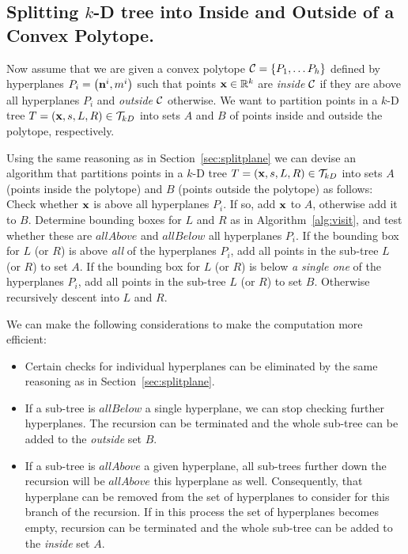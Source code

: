 \subsection{Splitting $k$-D tree into Inside and Outside of a Convex Polytope.}
Now assume that we are given a convex polytope $\mathcal{C} = \left\{P_1, \dots P_h\right\}$ defined by hyperplanes $P_i=\left(\mathbf{n}^i, m^i\right)$
  such that points $\mathbf{x}\in\mathbb{R}^k$ are \emph{inside} $\mathcal{C}$ if they are above all hyperplanes $P_i$ and \emph{outside} $\mathcal{C}$ otherwise.
We want to partition points in a $k$-D tree $T = \left( \mathbf{x}, s, L, R \right) \in \mathcal{T}_{kD}$
  into sets $A$ and $B$ of points inside and outside the polytope, respectively.

Using the same reasoning as in Section~\ref{sec:splitplane} we can devise an algorithm
  that partitions points in a $k$-D tree $T = \left( \mathbf{x}, s, L, R \right) \in \mathcal{T}_{kD}$
  into sets $A$ (points inside the polytope)
  and $B$ (points outside the polytope) as follows:
Check whether $\mathbf{x}$ is above all hyperplanes $P_i$.
If so, add $\mathbf{x}$ to $A$, otherwise add it to $B$.
Determine bounding boxes for $L$ and $R$ as in Algorithm~\ref{alg:visit},
  and test whether these are $\mathit{allAbove}$ and $\mathit{allBelow}$ all hyperplanes $P_i$.
If the bounding box for $L$ (or $R$) is above \emph{all} of the hyperplanes $P_i$,
  add all points in the sub-tree $L$ (or $R$) to set $A$.
If the bounding box for $L$ (or $R$) is below \emph{a single one} of the hyperplanes $P_i$,
  add all points in the sub-tree $L$ (or $R$) to set $B$.
Otherwise recursively descent into $L$ and $R$.

We can make the following considerations to make the computation more efficient:
\begin{itemize}
  \item Certain checks for individual hyperplanes can be eliminated by the same reasoning as in Section~\ref{sec:splitplane}.
  \item If a sub-tree is $\textit{allBelow}$ a single hyperplane, we can stop checking further hyperplanes.
      The recursion can be terminated and the whole sub-tree can be added to the \emph{outside} set $B$.
  \item If a sub-tree is $\textit{allAbove}$ a given hyperplane, all sub-trees further down the recursion will be $\textit{allAbove}$ this hyperplane as well.
      Consequently, that hyperplane can be removed from the set of hyperplanes to consider for this branch of the recursion.
      If in this process the set of hyperplanes becomes empty, recursion can be terminated and the whole sub-tree can be added to the \emph{inside} set $A$.
\end{itemize}

